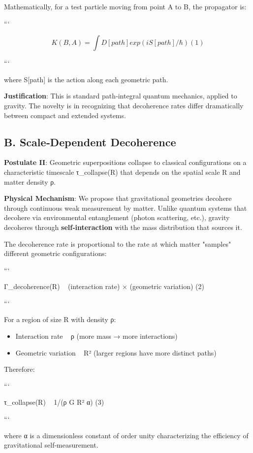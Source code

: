 \documentclass[11pt,a4paper]{article}
\begin{document}
Mathematically, for a test particle moving from point A to B, the propagator is:


```

\[
K(B,A) = ∫ D[path] exp(iS[path]/ℏ)     (1)
\]

```


where S[path] is the action along each geometric path.


\textbf{Justification}: This is standard path‑integral quantum mechanics, applied to gravity. The novelty is in recognizing that decoherence rates differ dramatically between compact and extended systems.


\subsection{B. Scale‑Dependent Decoherence}


\textbf{Postulate II}: Geometric superpositions collapse to classical configurations on a characteristic timescale τ\_collapse(R) that depends on the spatial scale R and matter density ρ.


\textbf{Physical Mechanism}: We propose that gravitational geometries decohere through continuous weak measurement by matter. Unlike quantum systems that decohere via environmental entanglement (photon scattering, etc.), gravity decoheres through \textbf{self‑interaction} with the mass distribution that sources it.


The decoherence rate is proportional to the rate at which matter "samples" different geometric configurations:


```

Γ\_decoherence(R) ~ (interaction rate) × (geometric variation)     (2)

```


For a region of size R with density ρ:

\begin{itemize}
\item Interaction rate ~ ρ (more mass → more interactions)
\item Geometric variation ~ R² (larger regions have more distinct paths)
\end{itemize}


Therefore:

```

τ\_collapse(R) ~ 1/(ρ G R² α)     (3)

```


where α is a dimensionless constant of order unity characterizing the efficiency of gravitational self‑measurement.
\end{document}

